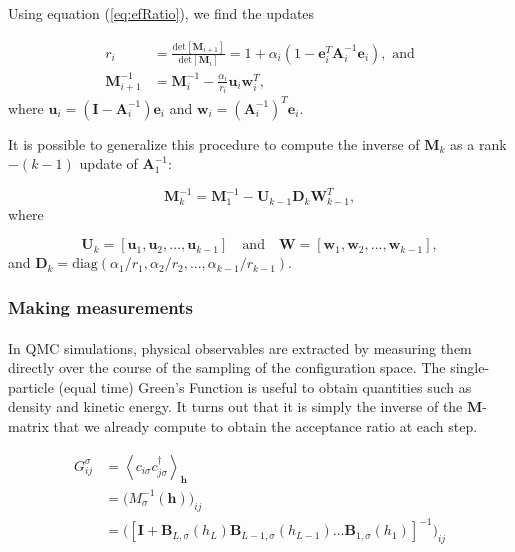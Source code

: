 \documentclass[10pt, twocolumn, twoside]{article}
\begin{document}
Using equation (\ref{eq:efRatio}), we find the updates

\begin{equation}
\begin{split}
r_i &= \frac{\text{det}[\bm M_{i+1}]}{\text{det}[\bm M_{i}]} = 1 + \alpha_i ( 1 - \bm e_i^T \bm A_i^{-1}  \bm e_i ) , \,\, \text{and} \\
\bm M_{i+1}^{-1} &= \bm M_i^{-1} - \frac{\alpha_i}{r_i} \bm u_i \bm w_i^T ,
\end{split}
\end{equation}
where $\bm u_i = (\bm I - \bm A_i^{-1} ) \bm e_i$ and $\bm w_i = (\bm A_i^{-1})^T \bm e_i$.

It is possible to generalize this procedure to compute the inverse of $\bm M_k$ as a rank$-(k-1)$ update of $\bm A_1^{-1}$:

\begin{equation}
\bm M_k^{-1} = \bm M_1^{-1} - \bm U_{k-1} \bm D_k \bm W_{k-1}^T ,
\end{equation}
where

\begin{equation}
\bm U_k = [ \bm u_1 , \bm u_2, ..., \bm u_{k-1} ] \quad \text{and} \quad \bm W = [ \bm w_1, \bm w_2, ..., \bm w_{k-1} ] ,
\end{equation}
and $\bm D_k = \text{diag}(\alpha_1 / r_1, \alpha_2 / r_2, ..., \alpha_{k-1} / r_{k-1})$.

\subsubsection{Making measurements}\paragraph{}

In QMC simulations, physical observables are extracted by measuring them directly over the course of the sampling of the  configuration space. The single-particle (equal time) Green's Function is useful to obtain quantities such as density and kinetic energy. It turns out that it is simply the inverse of the $\bm M$-matrix that we already compute to obtain the acceptance ratio at each step.

\begin{equation}
\begin{split}
G_{ij}^\sigma &= \left\langle c_{i\sigma} c_{j\sigma}^\dagger \right\rangle_{\bm h} \\
&= \bigg( M_\sigma^{-1} (\bm h) \bigg)_{ij} \\
&= \bigg( [\bm I + \bm B_{L,\sigma} ( h_L ) \bm B_{L-1,\sigma} ( h_{L-1} ) ... \bm B_{1,\sigma} ( h_1 ) ]^{-1} \bigg)_{ij}
\end{split}
\end{equation}
\end{document}
